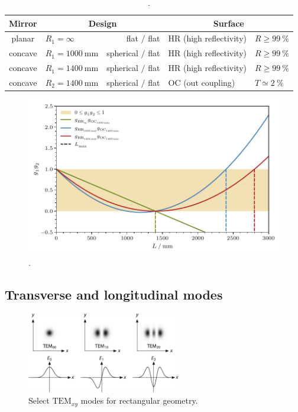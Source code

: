 \begin{table}
	\centering
	\caption{.}
	\begin{tabular}{clrll}
		\toprule
		Mirror & \multicolumn{2}{c}{Design} & \multicolumn{2}{c}{Surface} \\
		\midrule
		planar  & $R_1 = \infty$ & flat $\mathbin{/}$ flat & HR (high reflectivity) & $R \geq \qty{99}{\percent}$ \\
		concave & $R_1 = \qty{1000}{\milli\meter}$ & spherical $\mathbin{/}$ flat & HR (high reflectivity) & $R \geq \qty{99}{\percent}$ \\
		concave & $R_1 = \qty{1400}{\milli\meter}$ & spherical $\mathbin{/}$ flat & HR (high reflectivity) & $R \geq \qty{99}{\percent}$ \\
		concave & $R_2 = \qty{1400}{\milli\meter}$ & spherical $\mathbin{/}$ flat & OC (out coupling) & $T \simeq \qty{2}{\percent}$ \\
		\bottomrule
	\end{tabular}
	\label{tab:config}
\end{table}

\begin{figure}[H]
	\centering
	\includegraphics{build/stability.pdf}
	\caption{.}
	\label{fig:stability}
\end{figure}



\subsection{Transverse and longitudinal modes}

\begin{figure}[H]
	\centering
	\includegraphics[width=0.60\textwidth]{content/graphics/modes.pdf}
	\caption{Select $\text{TEM}_{xy}$ modes for rectangular geometry. \cite{Eichler_2018}}
	\label{fig:modes}
\end{figure}

